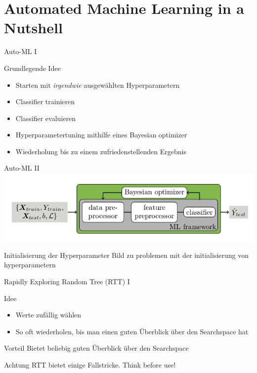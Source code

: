 \documentclass{beamer}
\begin{document}
	
	\section{Automated Machine Learning in a Nutshell}%
	
	
	\begin{frame}{Auto-ML I}
		\begin{alertblock}{Grundlegende Idee}
			\begin{itemize}
				\item Starten mit \emph{irgendwie} ausgewählten Hyperparametern
				\item Classifier trainieren
				\item Classifier evaluieren
				\item Hyperparametertuning mithilfe eines Bayesian optimizer
				\item Wiederholung bis zu einem zufriedenstellenden Ergebnis
			\end{itemize}
		\end{alertblock}
	\end{frame}
	
	\begin{frame}{Auto-ML II}
		\includegraphics[width=\linewidth]{Bilder/MachineLeaningInANutshell}
	\end{frame}
	
	\begin{frame}{Initialisierung der Hyperparameter}
		Bild zu problemen mit der initialisierung von hyperparametern
	\end{frame}
	
	\begin{frame}{Rapidly Exploring Random Tree (RTT) I}
		\begin{alertblock}{Idee}
			\begin{itemize}
				\item Werte zufällig wählen
				\item So oft wiederholen, bis man einen guten Überblick über den Searchspace hat
			\end{itemize}
		\end{alertblock}
		\pause
		\begin{alertblock}{Vorteil}
			Bietet beliebig guten Überblick über den Searchspace
		\end{alertblock}
		\pause
		\begin{alertblock}{Achtung}
			RTT bietet einige Fallstricke. Think before use!
		\end{alertblock}
	\end{frame}
	
\end{document}
